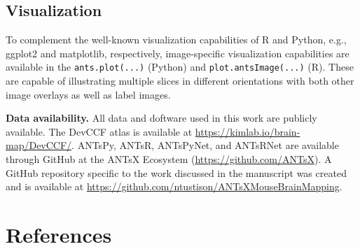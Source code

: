 \documentclass[
  12pt,
]{article}
\begin{document}
\hypertarget{visualization}{%
\subsection*{Visualization}\label{visualization}}

To complement the well-known visualization capabilities of R and Python,
e.g., ggplot2 and matplotlib, respectively, image-specific visualization
capabilities are available in the \texttt{ants.plot(...)} (Python) and
\texttt{plot.antsImage(...)} (R). These are capable of illustrating
multiple slices in different orientations with both other image overlays
as well as label images.

\clearpage
\newpage

\textbf{Data availability.} All data and doftware used in this work are
publicly available. The DevCCF atlas is available at
\url{https://kimlab.io/brain-map/DevCCF/}. ANTsPy, ANTsR, ANTsPyNet, and
ANTsRNet are available through GitHub at the ANTsX Ecosystem
(\url{https://github.com/ANTsX}). A GitHub repository specific to the
work discussed in the manuscript was created and is available at
\url{https://github.com/ntustison/ANTsXMouseBrainMapping}.

\clearpage

\hypertarget{references}{%
\section*{References}\label{references}}
\end{document}
